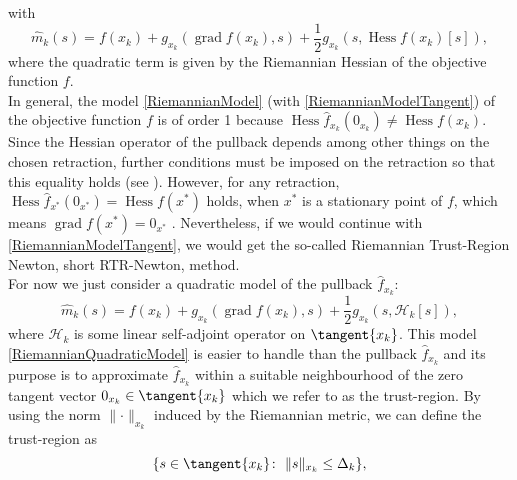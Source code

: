with
\begin{equation}\label{RiemannianModelTangent}
    \hat{m}_k( s ) = f(x_k) + g_{x_k}(\operatorname{grad} f(x_k), s ) + \frac{1}{2} g_{x_k}( s, \operatorname{Hess} f(x_k) [s]),
\end{equation}
where the quadratic term is given by the Riemannian Hessian of the objective function $f$. \\
In general, the model \cref{RiemannianModel} (with \cref{RiemannianModelTangent}) of the objective function $f$ is of order 1 because $\operatorname{Hess} \hat{f}_{x_k}(0_{x_k}) \neq \operatorname{Hess} f(x_k)$. Since the Hessian operator of the pullback depends among other things on the chosen retraction, further conditions must be imposed on the retraction so that this equality holds (see \cite[Proposition~5.5.5]{AbsilMahonySepulchre:2008}). However, for any retraction, $\operatorname{Hess} \hat{f}_{x^*}(0_{x^*}) = \operatorname{Hess} f(x^*)$ holds, when $x^*$ is a stationary point of $f$, which means $\operatorname{grad} f(x^*) = 0_{x^*}$ \cite[p.~138-139]{AbsilMahonySepulchre:2008}. Nevertheless, if we would continue with \cref{RiemannianModelTangent}, we would get the so-called Riemannian Trust-Region Newton, short RTR-Newton, method. \\
For now we just consider a quadratic model of the pullback $\hat{f}_{x_k}$:
\begin{equation}\label{RiemannianQuadraticModel}
    \hat{m}_k( s ) = f(x_k) + g_{x_k}(\operatorname{grad} f(x_k), s) + \frac{1}{2} g_{x_k}( s, \mathcal{H}_k [s]),
\end{equation}
where $\mathcal{H}_k$ is some linear self-adjoint operator on $\tangent{x_k}$. This model \cref{RiemannianQuadraticModel} is easier to handle than the pullback $\hat{f}_{x_k}$ and its purpose is to approximate $\hat{f}_{x_k}$ within a suitable neighbourhood of the zero tangent vector $0_{x_k} \in \tangent{x_k}$ which we refer to as the trust-region. By using the norm $\lVert \cdot \rVert_{x_k}$ induced by the Riemannian metric, we can define the trust-region as 
\begin{equation}\label{RiemannianTrustRegion}
    \{ s \in \tangent{x_k} \colon \ \lVert s \rVert_{x_k} \leq \Delta_k \},
\end{equation}
